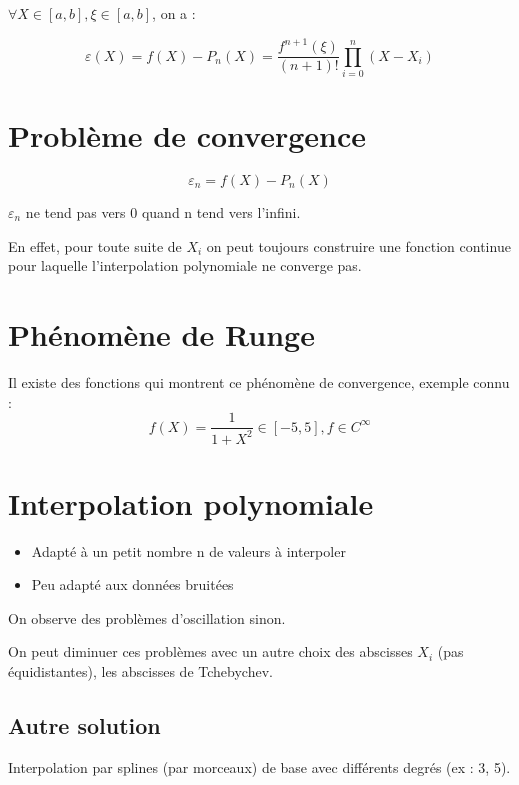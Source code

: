 $\forall X \in [a,b], \xi \in [a,b]$, on a :

\begin{equation}
\varepsilon(X) = f(X) - P_n(X) = \frac{f^{n + 1}(\xi)}{(n + 1)!} \prod_{i = 0}^n (X - X_i)
\end{equation}


\section {Problème de convergence}

\begin{equation}
\varepsilon_n = f(X) - P_n(X)
\end{equation}


$\varepsilon_n$ ne tend pas vers 0 quand n tend vers l'infini.

En effet, pour toute suite de $X_i$ on peut toujours construire une fonction continue pour laquelle l'interpolation polynomiale ne converge pas.


\section {Phénomène de Runge}

Il existe des fonctions qui montrent ce phénomène de convergence, exemple connu :
\begin{equation}
f(X) = \frac{1}{1 + X^2} \in [-5,5], f \in C^{\infty}
\end{equation}




\section* {Interpolation polynomiale}

\begin{itemize}
\item Adapté à un petit nombre n de valeurs à interpoler
\item Peu adapté aux données bruitées
\end{itemize}

On observe des problèmes d'oscillation sinon.

On peut diminuer ces problèmes avec un autre choix des abscisses $X_i$ (pas équidistantes), les abscisses de Tchebychev.


\subsection* {Autre solution}

Interpolation par splines (par morceaux) de base avec différents degrés (ex : 3, 5).



